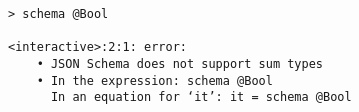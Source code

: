 \begin{repl}\begin{lstlisting}
> schema @Bool

<interactive>:2:1: error:
    • JSON Schema does not support sum types
    • In the expression: schema @Bool
      In an equation for ‘it’: it = schema @Bool\end{lstlisting}\end{repl}
